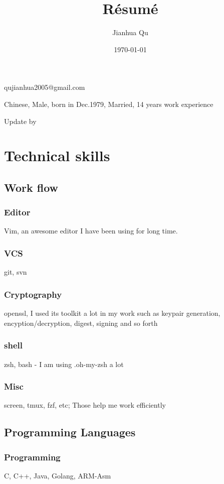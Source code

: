 \documentclass{article}
\makeatletter
\renewcommand{\maketitle}{
\begin{center}

{\huge\bfseries\theauthor}

\vspace{.25em}
qujianhua2005@gmail.com


\vspace{.25em}
Chinese, Male, born in Dec.1979, Married, 14 years work experience

\vspace{.25em}
Update by \thedate

\end{center}
}
\makeatother
\begin{document}
\title {R\'esum\'e}
\author {Jianhua Qu}
\date{\today}

\maketitle

\section{Technical skills}

\subsection{Work flow}
\subsubsection{Editor}
Vim, an awesome editor I have been using for long time.

\subsubsection{VCS}
git, svn

\subsubsection{Cryptography}
openssl, I used its toolkit a lot in my work such as keypair generation,
        encyption/decryption, digest, signing and so forth

\subsubsection{shell}
zsh, bash - I am using .oh-my-zsh a lot

\subsubsection{Misc}
screen, tmux, fzf, etc;
Those help me work efficiently

\subsection{Programming Languages}

\subsubsection{Programming}
C, C++, Java, Golang, ARM-Asm
\end{document}
